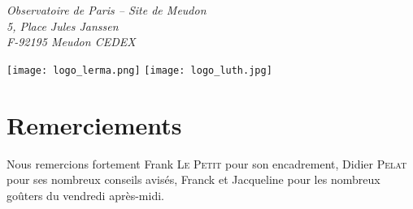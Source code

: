 \begin{center}
{\textit{Observatoire de Paris – Site de Meudon\\
5, Place Jules Janssen\\
F-92195 Meudon CEDEX}
} %

\vspace{0.5cm}

\texttt{[image: logo\_lerma.png]} \hfill \texttt{[image: logo\_luth.jpg]}

\end{center}

\vfill
\hfill \makeatletter \@date \makeatother

\newpage

\thispagestyle{empty}

\section*{Remerciements}

Nous remercions fortement Frank \textsc{Le Petit} pour son encadrement, Didier
\textsc{Pelat} pour ses nombreux conseils avisés, Franck et Jacqueline pour les nombreux
goûters du vendredi après-midi.

\tableofcontents

